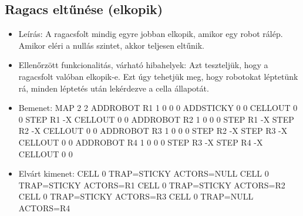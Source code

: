 \subsection{Ragacs eltűnése (elkopik)}
\begin{itemize}
	\item Leírás: \newline
	A ragacsfolt mindig egyre jobban elkopik, amikor egy robot rálép. Amikor eléri a nullás szintet, akkor teljesen eltűnik.
	\item Ellenőrzött funkcionalitás, várható hibahelyek: \newline 
	Azt teszteljük, hogy a ragacsfolt valóban elkopik-e. Ezt úgy tehetjük meg, hogy robotokat léptetünk rá, minden léptetés után lekérdezve a cella állapotát.
	\item Bemenet: \newline
	MAP 2 2  \newline
	ADDROBOT R1 1 0 0 0 \newline
	ADDSTICKY 0 0 \newline
	CELLOUT 0 0 \newline
	STEP R1 -X \newline
	CELLOUT 0 0 \newline
	ADDROBOT R2 1 0 0 0 \newline
	STEP R1 -X \newline
	STEP R2 -X \newline
	CELLOUT 0 0 \newline
	ADDROBOT R3 1 0 0 0 \newline
	STEP R2 -X \newline
	STEP R3 -X \newline
	CELLOUT 0 0 \newline
	ADDROBOT R4 1 0 0 0 \newline
	STEP R3 -X \newline
	STEP R4 -X \newline
	CELLOUT 0 0 \newline
	\item Elvárt kimenet: \newline
	CELL 0 TRAP=STICKY ACTORS=NULL
	\newline
	CELL 0 TRAP=STICKY ACTORS=R1
	\newline
	CELL 0 TRAP=STICKY ACTORS=R2
	\newline
	CELL 0 TRAP=STICKY ACTORS=R3
	\newline
	CELL 0 TRAP=NULL ACTORS=R4
	
\end{itemize}

